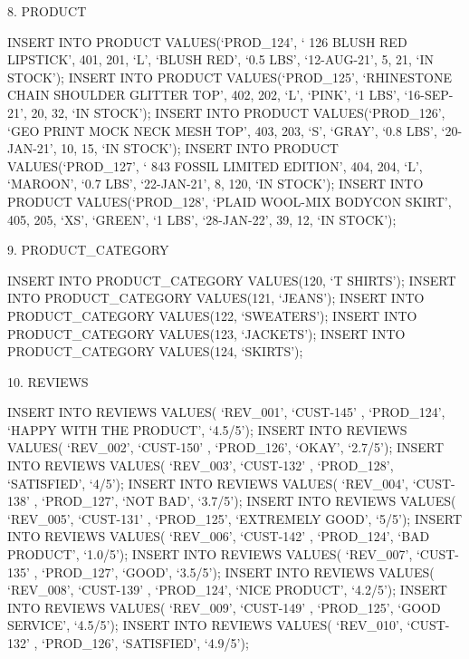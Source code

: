 8.	PRODUCT

INSERT INTO PRODUCT VALUES(‘PROD_124’, ‘ 126 BLUSH RED LIPSTICK’, 401, 201, ‘L’, ‘BLUSH RED’, ‘0.5 LBS’, ‘12-AUG-21’, 5, 21, ‘IN STOCK’);
INSERT INTO PRODUCT VALUES(‘PROD_125’, ‘RHINESTONE CHAIN SHOULDER GLITTER TOP’, 402, 202, ‘L’, ‘PINK’, ‘1 LBS’, ‘16-SEP-21’, 20, 32, ‘IN STOCK’);
INSERT INTO PRODUCT VALUES(‘PROD_126’, ‘GEO PRINT MOCK NECK MESH TOP’, 403, 203, ‘S’, ‘GRAY’, ‘0.8 LBS’, ‘20-JAN-21’, 10, 15, ‘IN STOCK’);
INSERT INTO PRODUCT VALUES(‘PROD_127’, ‘ 843 FOSSIL LIMITED EDITION’, 404, 204, ‘L’, ‘MAROON’, ‘0.7 LBS’, ‘22-JAN-21’, 8, 120, ‘IN STOCK’);
INSERT INTO PRODUCT VALUES(‘PROD_128’, ‘PLAID WOOL-MIX BODYCON SKIRT’, 405, 205, ‘XS’, ‘GREEN’, ‘1 LBS’, ‘28-JAN-22’, 39, 12, ‘IN STOCK’);


9.	PRODUCT_CATEGORY

INSERT INTO PRODUCT_CATEGORY VALUES(120, ‘T SHIRTS’);
INSERT INTO PRODUCT_CATEGORY VALUES(121, ‘JEANS’);
INSERT INTO PRODUCT_CATEGORY VALUES(122, ‘SWEATERS’);
INSERT INTO PRODUCT_CATEGORY VALUES(123, ‘JACKETS’);
INSERT INTO PRODUCT_CATEGORY VALUES(124, ‘SKIRTS’);


10.	REVIEWS


INSERT INTO REVIEWS VALUES( ‘REV_001’, ‘CUST-145’ , ‘PROD_124’, ‘HAPPY WITH THE PRODUCT’, ‘4.5/5’);
INSERT INTO REVIEWS VALUES( ‘REV_002’, ‘CUST-150’ , ‘PROD_126’, ‘OKAY’, ‘2.7/5’);
INSERT INTO REVIEWS VALUES( ‘REV_003’, ‘CUST-132’ , ‘PROD_128’, ‘SATISFIED’, ‘4/5’);
INSERT INTO REVIEWS VALUES( ‘REV_004’, ‘CUST-138’ , ‘PROD_127’, ‘NOT BAD’, ‘3.7/5’);
INSERT INTO REVIEWS VALUES( ‘REV_005’, ‘CUST-131’ , ‘PROD_125’, ‘EXTREMELY GOOD’, ‘5/5’);
INSERT INTO REVIEWS VALUES( ‘REV_006’, ‘CUST-142’ , ‘PROD_124’, ‘BAD PRODUCT’, ‘1.0/5’);
INSERT INTO REVIEWS VALUES( ‘REV_007’, ‘CUST-135’ , ‘PROD_127’, ‘GOOD’, ‘3.5/5’);
INSERT INTO REVIEWS VALUES( ‘REV_008’, ‘CUST-139’ , ‘PROD_124’, ‘NICE PRODUCT’, ‘4.2/5’);
INSERT INTO REVIEWS VALUES( ‘REV_009’, ‘CUST-149’ , ‘PROD_125’, ‘GOOD SERVICE’, ‘4.5/5’);
INSERT INTO REVIEWS VALUES( ‘REV_010’, ‘CUST-132’ , ‘PROD_126’, ‘SATISFIED’, ‘4.9/5’);

